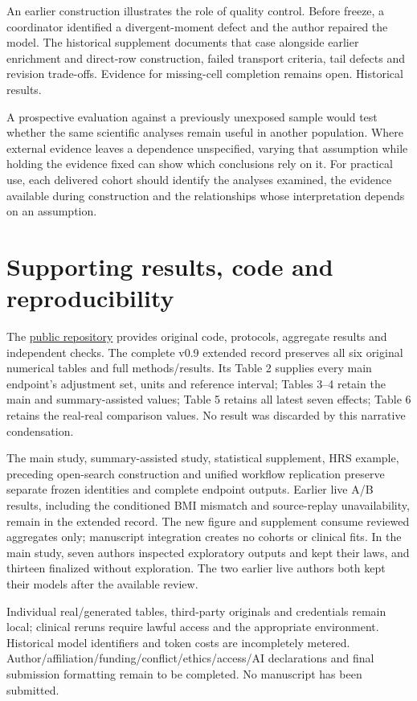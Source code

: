 \documentclass[10pt,twocolumn]{article}
\begin{document}
An earlier construction illustrates the role of quality control. Before freeze, a coordinator identified a divergent-moment defect and the author repaired the model. The historical supplement documents that case alongside earlier enrichment and direct-row construction, failed transport criteria, tail defects and revision trade-offs. Evidence for missing-cell completion remains open. Historical results.


A prospective evaluation against a previously unexposed sample would test whether the same scientific analyses remain useful in another population. Where external evidence leaves a dependence unspecified, varying that assumption while holding the evidence fixed can show which conclusions rely on it. For practical use, each delivered cohort should identify the analyses examined, the evidence available during construction and the relationships whose interpretation depends on an assumption.


\section{Supporting results, code and reproducibility}

The \href{https://github.com/ziwang11112/evidence-guided-virtual-cohorts-2026}{public repository} provides original code, protocols, aggregate results and independent checks. The complete v0.9 extended record preserves all six original numerical tables and full methods/results. Its Table 2 supplies every main endpoint's adjustment set, units and reference interval; Tables 3–4 retain the main and summary-assisted values; Table 5 retains all latest seven effects; Table 6 retains the real-real comparison values. No result was discarded by this narrative condensation.


The main study, summary-assisted study, statistical supplement, HRS example, preceding open-search construction and unified workflow replication preserve separate frozen identities and complete endpoint outputs. Earlier live A/B results, including the conditioned BMI mismatch and source-replay unavailability, remain in the extended record. The new figure and supplement consume reviewed aggregates only; manuscript integration creates no cohorts or clinical fits. In the main study, seven authors inspected exploratory outputs and kept their laws, and thirteen finalized without exploration. The two earlier live authors both kept their models after the available review.


Individual real/generated tables, third-party originals and credentials remain local; clinical reruns require lawful access and the appropriate environment. Historical model identifiers and token costs are incompletely metered. Author/affiliation/funding/conflict/ethics/access/AI declarations and final submission formatting remain to be completed. No manuscript has been submitted.
\end{document}
